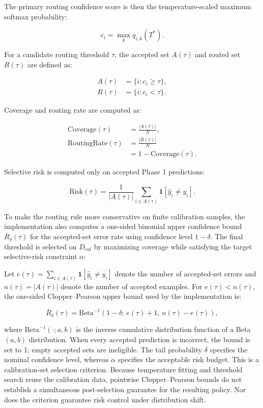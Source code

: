 \documentclass{ieeeaccess}
\begin{document}
The primary routing confidence score is then the temperature-scaled maximum softmax probability:

\begin{equation}
c_i=\max_k q_{i,k}(T^*).
\end{equation}

For a candidate routing threshold $\tau$, the accepted set $A(\tau)$ and routed set $R(\tau)$ are defined as:

\begin{align}
A(\tau) &= \{i: c_i \geq \tau\}, \\
R(\tau) &= \{i: c_i < \tau\}.
\end{align}

Coverage and routing rate are computed as:

\begin{align}
\mathrm{Coverage}(\tau) &= \frac{|A(\tau)|}{N}, \\
\mathrm{RoutingRate}(\tau) &= \frac{|R(\tau)|}{N} \\
&= 1-\mathrm{Coverage}(\tau).
\end{align}

Selective risk is computed only on accepted Phase 1 predictions:

\begin{equation}
\mathrm{Risk}(\tau)=
\frac{1}{|A(\tau)|}
\sum_{i \in A(\tau)}
\mathbf{1}[\hat{y}_i \ne y_i].
\end{equation}

To make the routing rule more conservative on finite calibration samples, the implementation also computes a one-sided binomial upper confidence bound $\overline{R}_{\delta}(\tau)$ for the accepted-set error rate using confidence level $1-\delta$. The final threshold is selected on $D_{cal}$ by maximizing coverage while satisfying the target selective-risk constraint $\alpha$:

Let $e(\tau)=\sum_{i\in A(\tau)}\mathbf{1}[\hat{y}_i\ne y_i]$ denote the number of accepted-set errors and $n(\tau)=|A(\tau)|$ denote the number of accepted examples. For $e(\tau)<n(\tau)$, the one-sided Clopper--Pearson upper bound used by the implementation is:

\begin{equation}
\overline{R}_{\delta}(\tau)=
\mathrm{Beta}^{-1}\!\left(
1-\delta;\,
e(\tau)+1,\,
n(\tau)-e(\tau)
\right),
\label{eq:clopper-pearson-bound}
\end{equation}

where $\mathrm{Beta}^{-1}(\cdot;a,b)$ is the inverse cumulative distribution function of a Beta$(a,b)$ distribution. When every accepted prediction is incorrect, the bound is set to 1; empty accepted sets are ineligible. The tail probability $\delta$ specifies the nominal confidence level, whereas $\alpha$ specifies the acceptable risk budget. This is a calibration-set selection criterion. Because temperature fitting and threshold search reuse the calibration data, pointwise Clopper--Pearson bounds do not establish a simultaneous post-selection guarantee for the resulting policy. Nor does the criterion guarantee risk control under distribution shift.
\end{document}
